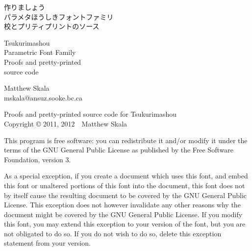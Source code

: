 \documentclass[14pt,twoside]{extarticle}
\begin{document}
\pagestyle{plain}\thispagestyle{empty}


\kaku
\begin{center}\LARGE

\vspace*{\fill}

{\Huge 作りましょう~\TsukurimashouVWide}\\
{\huge パラメタほうしきフォントファミリ\\
校とプリティプリントのソース}

\vspace*{0.75in}

{\Huge Tsukurimashou~\TsukurimashouVersion}\\
{\huge Parametric Font Family\\
Proofs and pretty-printed\\source code}

\vspace*{1.5in}

Matthew Skala\\
mskala@ansuz.sooke.bc.ca\\
\TsukurimashouRDWide\qquad\TsukurimashouReleaseDate

\vspace*{\fill}

\end{center}
\clearpage


\vspace*{\fill}

Proofs and pretty-printed source code for Tsukurimashou\\
Copyright © 2011, 2012~~Matthew Skala

This program is free software: you can redistribute it and/or modify
it under the terms of the GNU General Public License as published by
the Free Software Foundation, version 3.

As a special exception, if you create a document which uses this font, and
embed this font or unaltered portions of this font into the document, this
font does not by itself cause the resulting document to be covered by the
GNU General Public License. This exception does not however invalidate any
other reasons why the document might be covered by the GNU General Public
License. If you modify this font, you may extend this exception to your
version of the font, but you are not obligated to do so. If you do not
wish to do so, delete this exception statement from your version.
\end{document}
